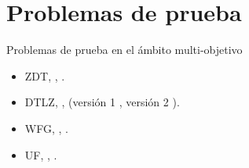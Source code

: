 \documentclass{beamer}
\begin{document}
\section{Problemas de prueba}
\begin{frame}{Problemas de prueba en el ámbito multi-objetivo}
\begin{itemize}
   \item ZDT, \citeauthor{Joel:ZDT}, \citeyear{Joel:ZDT}.%
   \item DTLZ, \citeauthor{Joel:DTLZ_1}, (versión 1 \citeyear{Joel:DTLZ_1}, versión 2 \citeyear{Joel:DTLZ_2}).%
   \item WFG, \citeauthor{Joel:WFG_Main}, \citeyear{Joel:WFG_Main}.%
   \item UF, \citeauthor{Joel:CEC2009}, \citeyear{Joel:CEC2009}.%
\end{itemize}
\end{frame}
\end{document}
